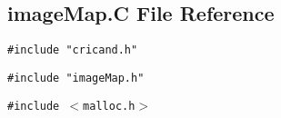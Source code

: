 \subsection{image\-Map.C File Reference}
\label{imageMap.C}
{\tt \#include "cricand.h"}\par
{\tt \#include "image\-Map.h"}\par
{\tt \#include $<$malloc.h$>$}\par
